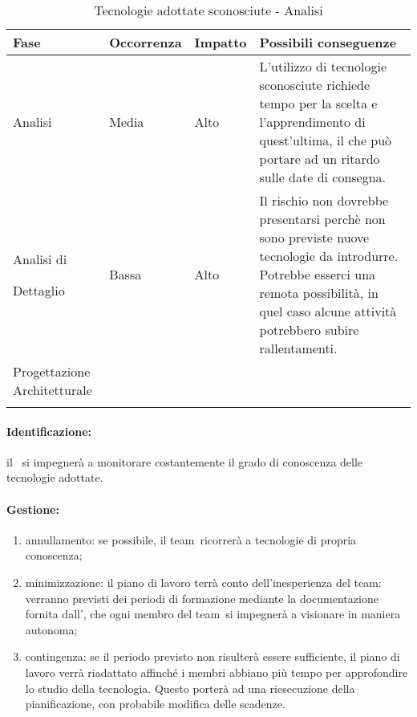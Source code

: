 \documentclass[../PianoProgetto.tex]{subfiles}
\begin{document}
	\begin{table}[h]
		\centering
		\begin{tabularx}{\textwidth}{F O O P}
			\toprule
			\textbf{Fase} & \textbf{Occorrenza} & \textbf{Impatto} & \textbf{Possibili conseguenze}\\
			\midrule
			Analisi & Media & Alto & L'utilizzo di tecnologie sconosciute richiede tempo per la scelta e l'apprendimento di quest'ultima, il che può portare ad un ritardo sulle date di consegna. \\
			\midrule
			Analisi di \par Dettaglio & Bassa & Alto & Il rischio non dovrebbe presentarsi perchè non sono previste nuove tecnologie da introdurre. Potrebbe esserci una remota possibilità, in quel caso alcune attività potrebbero subire rallentamenti. \\
			\midrule
			Progettazione Architetturale & & & \\
			\bottomrule
		\end{tabularx}
		\caption{Tecnologie adottate sconosciute - Analisi}
		\label{tab:Tecnologie adottate sconosciute - Analisi}	
	\end{table} 
	
	\paragraph*{Identificazione:} il \responsabilediprogetto\ si impegnerà a monitorare costantemente il grado di conoscenza delle tecnologie adottate.	
	
	\paragraph*{Gestione:}
	\begin{enumerate}
		\item annullamento: se possibile, il team\g\ ricorrerà a tecnologie di propria conoscenza;
		\item minimizzazione: il piano di lavoro terrà conto dell'inesperienza del team\g : verranno previsti dei periodi di formazione mediante la documentazione fornita dall'\amministratore , che ogni membro del team\g\ si impegnerà a visionare in maniera autonoma;
		\item contingenza: se il periodo previsto non risulterà essere sufficiente, il piano di lavoro verrà riadattato affinché i membri abbiano più tempo per approfondire lo studio della tecnologia. Questo porterà ad una riesecuzione della pianificazione, con probabile modifica delle scadenze.
	\end{enumerate}
	
\end{document}
